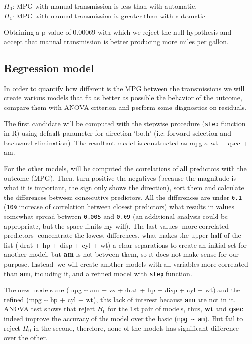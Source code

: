 \documentclass[]{article}
\begin{document}
$H_{0}$: MPG with manual transmission is less than with
automatic.\\$H_{1}$: MPG with manual transmission is greater than with
automatic.

Obtaining a p-value of 0.00069 with which we reject the null hypothesis
and accept that manual transmission is better producing more miles per
gallon.

\subsection{Regression model}\label{regression-model}

In order to quantify how different is the MPG between the transmissions
we will create various models that fit as better as possible the
behavior of the outcome, compare them with ANOVA criterion and perform
some diagnostics on residuals.

The first candidate will be computed with the stepwise procedure
(\texttt{step} function in R) using default parameter for direction
`both' (i.e: forward selection and backward elimination). The resultant
model is constructed as mpg \textasciitilde{} wt + qsec + am.

For the other models, will be computed the correlations of all
predictors with the outcome (MPG). Then, turn positive the negatives
(because the magnitude is what it is important, the sign only shows the
direction), sort them and calculate the differences between consecutive
predictors. All the differences are under \texttt{0.1} (\texttt{10\%}
increase of correlation between closest predictors) what results in
values somewhat spread between \texttt{0.005} and \texttt{0.09} (an
additional analysis could be appropriate, but the space limits my will).
The last values -more correlated predictors- concentrate the lowest
differences, what makes the upper half of the list ( drat + hp + disp +
cyl + wt) a clear separations to create an initial set for another
model, but \textbf{am} is not between them, so it does not make sense
for our purpose. Instead, we will create another models with all
variables more correlated than \textbf{am}, including it, and a refined
model with \texttt{step} function.

The new models are (mpg \textasciitilde{} am + vs + drat + hp + disp +
cyl + wt) and the refined (mpg \textasciitilde{} hp + cyl + wt), this
lack of interest because \textbf{am} are not in it. ANOVA test shows
that reject $H_{0}$ for the 1st pair of models, thus, \textbf{wt} and
\textbf{qsec} indeed improve the accuracy of the model over the basic
(\texttt{mpg \textasciitilde{} am}). But fail to reject $H_{0}$ in the
second, therefore, none of the models has significant difference over
the other.
\end{document}
